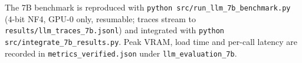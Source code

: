 \documentclass[11pt,a4paper]{article}
\theoremstyle{plain}
\begin{document}
The 7B benchmark is reproduced with \texttt{python src/run\_llm\_7b\_benchmark.py} (4-bit NF4, GPU-0 only, resumable; traces stream to \texttt{results/llm\_traces\_7b.jsonl}) and integrated with \texttt{python src/integrate\_7b\_results.py}. Peak VRAM, load time and per-call latency are recorded in \texttt{metrics\_verified.json} under \texttt{llm\_evaluation\_7b}.



\end{document}
